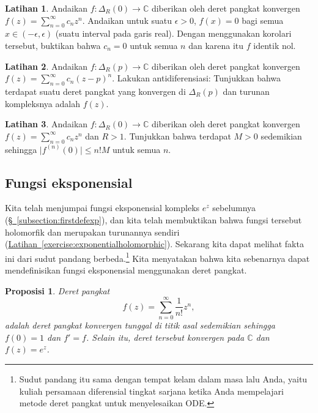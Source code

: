 \documentclass[12pt,openany]{book}
\newcommand{\sabs}[1]{\lvert {#1} \rvert}
\newcommand{\C}{{\mathbb{C}}}
\theoremstyle{plain}
\newtheorem{prop}[thm]{Proposisi}
\theoremstyle{remark}
\theoremstyle{definition}
\newenvironment{exbox}{%
    \def\FrameCommand{\vrule width 1pt \relax\hspace{10pt}}%
    \MakeFramed{\advance\hsize-\width\FrameRestore}%
}{%
    \endMakeFramed
}
\theoremstyle{exercise}
\newtheorem{exercise}{Latihan}[section]
\theoremstyle{example}
\newcommand{\subsectionref}[1]{\hyperref[#1]{\S~\ref*{#1}}}
\newcommand{\exerciseref}[1]{\hyperref[#1]{Latihan~\ref*{#1}}}
\begin{document}
\begin{exbox}
\begin{exercise}
Andaikan $f \colon \Delta_R(0) \to \C$ diberikan oleh deret pangkat
konvergen
$f(z) = \sum_{n=0}^\infty c_n z^n$.
Andaikan untuk suatu $\epsilon > 0$, $f(x) = 0$ bagi semua $x \in
(-\epsilon,\epsilon)$ (suatu interval pada garis real).
Dengan menggunakan korolari tersebut,
buktikan bahwa $c_n = 0$ untuk semua $n$ dan karena itu $f$ identik nol.
\end{exercise}

\begin{exercise} \label{exercise:antidefpowerser}
Andaikan $f \colon \Delta_R(p) \to \C$ diberikan oleh deret pangkat
konvergen
$f(z) = \sum_{n=0}^\infty c_n {(z-p)}^n$.
Lakukan antidiferensiasi:
Tunjukkan bahwa terdapat suatu deret pangkat yang konvergen di $\Delta_R(p)$
dan turunan kompleksnya adalah $f(z)$.
\end{exercise}

\begin{exercise} 
Andaikan $f \colon \Delta_R(0) \to \C$ diberikan oleh deret pangkat
konvergen
$f(z) = \sum_{n=0}^\infty c_n {z}^n$ dan $R > 1$.
Tunjukkan bahwa terdapat $M>0$ sedemikian sehingga
$\sabs{f^{(n)}(0)} \leq n! M$ untuk semua $n$.
\end{exercise}
\end{exbox}

\subsection{Fungsi eksponensial}

Kita telah menjumpai fungsi eksponensial kompleks $e^z$ sebelumnya
(\subsectionref{subsection:firstdefexp}), dan kita telah membuktikan
bahwa fungsi tersebut holomorfik dan merupakan turunannya sendiri
(\exerciseref{exercise:exponentialholomorphic}).  Sekarang kita dapat melihat fakta ini
dari sudut pandang berbeda.\footnote{%
Sudut pandang itu sama dengan tempat kelam dalam masa lalu Anda,
yaitu kuliah persamaan diferensial tingkat sarjana ketika Anda mempelajari
metode deret pangkat untuk menyelesaikan ODE.}
Kita menyatakan bahwa kita sebenarnya dapat mendefinisikan fungsi eksponensial
menggunakan deret pangkat.

\begin{prop}
Deret pangkat
\begin{equation*}
f(z) = \sum_{n=0}^\infty \frac{1}{n!} z^n ,
\end{equation*}
adalah deret pangkat konvergen tunggal di titik asal
sedemikian sehingga $f(0)=1$ dan $f'=f$.
Selain itu, deret tersebut konvergen pada $\C$ dan
$f(z) = e^z$.
\end{prop}
\end{document}
